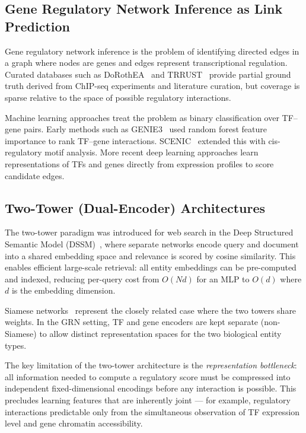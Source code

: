 \documentclass[journal]{IEEEtran}
\begin{document}
\subsection{Gene Regulatory Network Inference as Link Prediction}

Gene regulatory network inference is the problem of identifying directed edges
in a graph where nodes are genes and edges represent transcriptional
regulation. Curated databases such as DoRothEA~\cite{garcia2019} and
TRRUST~\cite{han2018} provide partial ground truth derived from ChIP-seq
experiments and literature curation, but coverage is sparse relative to the
space of possible regulatory interactions.

Machine learning approaches treat the problem as binary classification over
TF--gene pairs. Early methods such as GENIE3~\cite{huynh2010} used random
forest feature importance to rank TF--gene interactions. SCENIC~\cite{aibar2017}
extended this with cis-regulatory motif analysis. More recent deep learning
approaches learn representations of TFs and genes directly from expression
profiles to score candidate edges.

\subsection{Two-Tower (Dual-Encoder) Architectures}

The two-tower paradigm was introduced for web search in the Deep Structured
Semantic Model (DSSM)~\cite{huang2013}, where separate networks encode query
and document into a shared embedding space and relevance is scored by cosine
similarity. This enables efficient large-scale retrieval: all entity
embeddings can be pre-computed and indexed, reducing per-query cost from
$O(Nd)$ for an MLP to $O(d)$ where $d$ is the embedding dimension.

Siamese networks~\cite{bromley1993} represent the closely related case where
the two towers share weights. In the GRN setting, TF and gene encoders are
kept separate (non-Siamese) to allow distinct representation spaces for the
two biological entity types.

The key limitation of the two-tower architecture is the
\emph{representation bottleneck}: all information needed to compute a
regulatory score must be compressed into independent fixed-dimensional
encodings before any interaction is possible. This precludes learning
features that are inherently joint --- for example, regulatory interactions
predictable only from the simultaneous observation of TF expression level and
gene chromatin accessibility.
\end{document}
